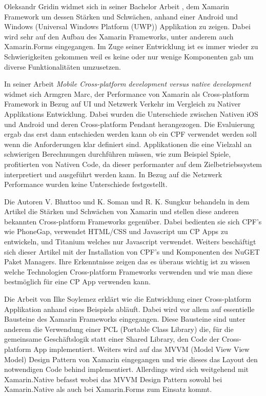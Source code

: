 Oleksandr Gridin widmet sich in seiner Bachelor Arbeit \cite{Oleksandr2015}, dem Xamarin Framework um dessen Stärken und Schwächen, anhand einer Android und Windows (Universal Windows Platform (UWP)) Applikation zu zeigen. Dabei wird sehr auf den Aufbau des Xamarin Frameworks, unter anderem auch Xamarin.Forms eingegangen. Im Zuge seiner Entwicklung ist es immer wieder zu Schwierigkeiten gekommen weil es keine oder nur wenige Komponenten gab um diverse Funktionalitäten umzusetzen.

In seiner Arbeit \cite{Armgren852125} \textit{Mobile Cross-platform development versus native development} widmet sich Armgren Marc, der  Performance von Xamarin als Cross-platform Framework in Bezug auf UI und Netzwerk Verkehr im Vergleich zu Nativer Applikations Entwicklung. Dabei wurden die Unterschiede zwischen Nativen iOS und Android und deren Cross-platform Pendant herangezogen. Die Evaluierung ergab das erst dann entschieden werden kann ob ein CPF verwendet werden soll wenn die Anforderungen klar definiert sind. Applikationen die eine Vielzahl an schwierigen Berechnungen durchführen müssen, wie zum Beispiel Spiele, profitierten von Nativen Code, da dieser performanter auf dem Zielbetriebssystem interpretiert und ausgeführt werden kann. In Bezug auf die Netzwerk Performance wurden keine Unterschiede festgestellt. 

Die Autoren V. Bhuttoo und K. Soman und R. K. Sungkur behandeln in dem Artikel \cite{8016193} die Stärken und Schwächen von Xamarin und stellen diese anderen bekannten Cross-platform Frameworks gegenüber. Dabei bedienten sie sich CPF's wie PhoneGap, verwendet HTML/CSS und Javascript um CP Apps zu entwickeln, und Titanium welches nur Javascript verwendet. Weiters beschäftigt sich dieser Artikel mit der Installation von CPF's und Komponenten des NuGET Paket Managers. Ihre Erkenntnisse zeigen das es überaus wichtig ist zu wissen welche Technologien Cross-platform Frameworks verwenden und wie man diese bestmöglich für eine CP App verwenden kann.

Die Arbeit von Ilke Soylemez \cite{Mukesh2016} erklärt wie die Entwicklung einer Cross-platform Applikation anhand eines Beispiels abläuft. Dabei wird vor allem auf essentielle Bausteine des Xamarin Frameworks eingegangen. Diese Bausteine sind unter anderem die Verwendung einer PCL (Portable Class Library) die, für die gemeinsame Geschäftslogik statt einer Shared Library, den Code der Cross-platform App implementiert. Weiters wird auf das MVVM (Model View View Model) Design Pattern von Xamarin eingegangen und wie dieses das Layout den notwendigen Code behind implementiert. Allerdings wird sich weitgehend mit Xamarin.Native befasst wobei das MVVM Design Pattern sowohl bei Xamarin.Native als auch bei Xamarin.Forms zum Einsatz kommt.

